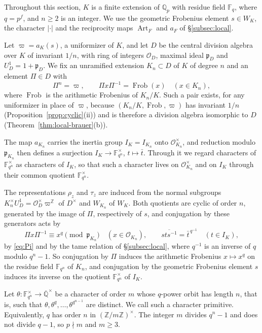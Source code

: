 \documentclass[a4paper,11pt]{amsart}
\theoremstyle{definition}
\theoremstyle{remark}
\numberwithin{equation}{section}
\newcommand{\Q}{\mathbb{Q}}
\newcommand{\Z}{\mathbb{Z}}
\DeclareMathOperator{\Frob}{Frob}
\newcommand{\F}{\mathbb{F}}
\newcommand{\Qbar}{\overline{\mathbb{Q}}}
\newcommand{\OO}{\mathcal{O}}
\DeclareMathOperator{\Art}{Art}
\begin{document}
Throughout this section, $K$ is a finite extension of $\Q_p$ with residue field $\F_q$, where $q=p^f$, and $n\geq2$ is an integer. We use the geometric Frobenius element $s\in W_K$, the character $|\cdot|$ and the reciprocity maps $\Art_F$ and $a_F$ of \S\ref{subsec:local}.

Let $\varpi=a_K(s)$, a uniformizer of $K$, and let $D$ be the central division algebra over $K$ of invariant $1/n$, with ring of integers $\OO_D$, maximal ideal $\mathfrak p_D$ and $U_D^1=1+\mathfrak p_D$. We fix an unramified extension $K_n\subset D$ of $K$ of degree $n$ and an element $\Pi\in D$ with
\begin{equation}\label{eq:Pi}
 \Pi^n=\varpi,\qquad \Pi x\Pi^{-1}=\Frob(x)\quad(x\in K_n),
\end{equation}
where $\Frob$ is the arithmetic Frobenius of $K_n/K$. Such a pair exists, for any uniformizer in place of $\varpi$, because $(K_n/K,\Frob,\varpi)$ has invariant $1/n$ (Proposition~\ref{prop:cyclic}(ii)) and is therefore a division algebra isomorphic to $D$ (Theorem~\ref{thm:local-brauer}(b)).

The map $a_{K_n}$ carries the inertia group $I_K=I_{K_n}$ onto $\OO_{K_n}^\times$, and reduction modulo $\mathfrak p_{K_n}$ then defines a surjection $I_K\to\F_{q^n}^\times$, $t\mapsto\bar t$. Through it we regard characters of $\F_{q^n}^\times$ as characters of $I_K$, so that such a character lives on $\OO_{K_n}^\times$ and on $I_K$ through their common quotient $\F_{q^n}^\times$.

The representations $\rho_z$ and $\tau_z$ are induced from the normal subgroups $K_n^\times U_D^1=\OO_D^\times\varpi^{\Z}$ of $D^\times$ and $W_{K_n}$ of $W_K$. Both quotients are cyclic of order $n$, generated by the image of $\Pi$, respectively of $s$, and conjugation by these generators acts by
\[
 \Pi x\Pi^{-1}\equiv x^{q}\pmod{\mathfrak p_{K_n}}\quad(x\in\OO_{K_n}),\qquad \overline{sts^{-1}}=\bar t^{\,q^{-1}}\quad(t\in I_K),
\]
by \eqref{eq:Pi} and by the tame relation of \S\ref{subsec:local}, where $q^{-1}$ is an inverse of $q$ modulo $q^n-1$. So conjugation by $\Pi$ induces the arithmetic Frobenius $x\mapsto x^q$ on the residue field $\F_{q^n}$ of $K_n$, and conjugation by the geometric Frobenius element $s$ induces its inverse on the quotient $\F_{q^n}^\times$ of $I_K$.

Let $\theta\colon\F_{q^n}^\times\to\Qbar^\times$ be a character of order $m$ whose $q$-power orbit has length $n$, that is, such that $\theta,\theta^q,\dots,\theta^{q^{n-1}}$ are distinct. We call such a character primitive. Equivalently, $q$ has order $n$ in $(\Z/m\Z)^\times$. The integer $m$ divides $q^n-1$ and does not divide $q-1$, so $p\nmid m$ and $m\geq3$.
\end{document}
